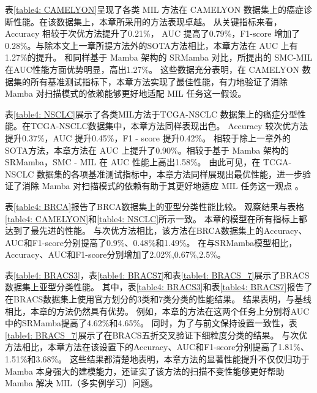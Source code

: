 

表\ref{table4: CAMELYON}呈现了各类 MIL 方法在 CAMELYON 数据集上的癌症诊断性能。在该数据集上，本章所采用的方法表现卓越。
从关键指标来看，Accuracy 相较于次优方法提升了0.21\%，
AUC 提高了0.79\%，F1-score 增加了0.28\%。与除本文上一章所提方法外的SOTA方法相比，本章方法在 AUC 上有1.27\%的提升。
和同样基于 Mamba 架构的 SRMamba 对比，所提出的 SMC-MIL 在AUC性能方面优势明显，高出1.27\%。
这些数据充分表明，在 CAMELYON 数据集的所有基准测试指标下，本章方法实现了最佳性能，有力地验证了消除 Mamba 对扫描模式的依赖能够更好地适配 MIL 任务这一假设。

表\ref{table4: NSCLC}展示了各类MIL方法于TCGA-NSCLC 数据集上的癌症分型性能。在TCGA-NSCLC数据集中，本章方法同样表现出色。
Accuracy 较次优方法提升0.37\%，AUC 提升0.45\%，F1 - score 提升0.42\%。
相较于除上一章外的SOTA方法，本章方法在 AUC 上提升了0.90\%。相较于基于 Mamba 架构的 SRMamba，SMC - MIL 在 AUC 性能上高出1.58\%。
由此可见，在 TCGA-NSCLC 数据集的各项基准测试指标中，本章方法同样展现出最优性能，进一步验证了消除 Mamba 对扫描模式的依赖有助于其更好地适应 MIL 任务这一观点 。


表\ref{table4: BRCA}报告了BRCA数据集上的亚型分类性能比较。
观察结果与表格\ref{table4: CAMELYON}和\ref{table4: NSCLC}所示一致。
本章的模型在所有指标上都达到了最先进的性能。
与次优方法相比，该方法在BRCA数据集上的Accuracy、AUC和F1-score分别提高了0.9\%、0.48\%和1.49\%。
在与SRMamba模型相比，Accuracy、AUC和F1-score分别增加了2.02\%,0.67\%,2.5\%。


表\ref{table4: BRACS3}，表\ref{table4: BRACS7}和表\ref{table4: BRACS_7}展示了BRACS数据集上亚型分类性能。
其中，表\ref{table4: BRACS3}和表\ref{table4: BRACS7}报告了在BRACS数据集上使用官方划分的3类和7类分类的性能结果。
结果表明，与基线相比，本章的方法仍然具有优势。
例如，本章的方法在这两个任务上分别将AUC中的SRMamba提高了4.62\%和4.65\%。
同时，为了与前文保持设置一致性，表\ref{table4: BRACS_7}展示了在BRACS五折交叉验证下细粒度分类的结果。
与次优方法相比，本章方法在该设置下的Accuracy、AUC和F1-score分别提高了1.81\%、1.51\%和3.68\%。
这些结果都清楚地表明，本章方法的显著性能提升不仅仅归功于 Mamba 本身强大的建模能力，还证实了该方法的扫描不变性能够更好帮助 Mamba 解决 MIL（多实例学习）问题。

